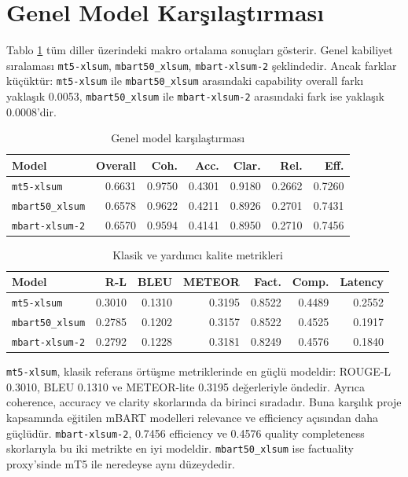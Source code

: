 \documentclass[12pt,a4paper]{article}
\begin{document}
\section{Genel Model Karşılaştırması}

Tablo \ref{tab:overall} tüm diller üzerindeki makro ortalama sonuçları gösterir. Genel kabiliyet sıralaması \texttt{mt5-xlsum}, \texttt{mbart50\_xlsum}, \texttt{mbart-xlsum-2} şeklindedir. Ancak farklar küçüktür: \texttt{mt5-xlsum} ile \texttt{mbart50\_xlsum} arasındaki capability overall farkı yaklaşık 0.0053, \texttt{mbart50\_xlsum} ile \texttt{mbart-xlsum-2} arasındaki fark ise yaklaşık 0.0008'dir.

\begin{table}[H]
\centering
\caption{Genel model karşılaştırması}
\label{tab:overall}
\begin{tabular}{lrrrrrr}
\toprule
Model & Overall & Coh. & Acc. & Clar. & Rel. & Eff. \\
\midrule
\texttt{mt5-xlsum} & 0.6631 & 0.9750 & 0.4301 & 0.9180 & 0.2662 & 0.7260 \\
\texttt{mbart50\_xlsum} & 0.6578 & 0.9622 & 0.4211 & 0.8926 & 0.2701 & 0.7431 \\
\texttt{mbart-xlsum-2} & 0.6570 & 0.9594 & 0.4141 & 0.8950 & 0.2710 & 0.7456 \\
\bottomrule
\end{tabular}
\end{table}

\begin{table}[H]
\centering
\caption{Klasik ve yardımcı kalite metrikleri}
\begin{tabular}{lrrrrrr}
\toprule
Model & R-L & BLEU & METEOR & Fact. & Comp. & Latency \\
\midrule
\texttt{mt5-xlsum} & 0.3010 & 0.1310 & 0.3195 & 0.8522 & 0.4489 & 0.2552 \\
\texttt{mbart50\_xlsum} & 0.2785 & 0.1202 & 0.3157 & 0.8522 & 0.4525 & 0.1917 \\
\texttt{mbart-xlsum-2} & 0.2792 & 0.1228 & 0.3181 & 0.8249 & 0.4576 & 0.1840 \\
\bottomrule
\end{tabular}
\end{table}

\texttt{mt5-xlsum}, klasik referans örtüşme metriklerinde en güçlü modeldir: ROUGE-L 0.3010, BLEU 0.1310 ve METEOR-lite 0.3195 değerleriyle öndedir. Ayrıca coherence, accuracy ve clarity skorlarında da birinci sıradadır. Buna karşılık proje kapsamında eğitilen mBART modelleri relevance ve efficiency açısından daha güçlüdür. \texttt{mbart-xlsum-2}, 0.7456 efficiency ve 0.4576 quality completeness skorlarıyla bu iki metrikte en iyi modeldir. \texttt{mbart50\_xlsum} ise factuality proxy'sinde mT5 ile neredeyse aynı düzeydedir.
\end{document}
